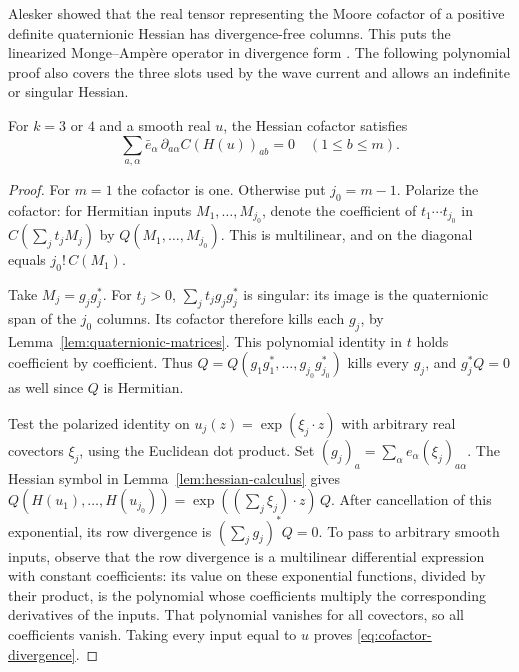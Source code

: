 Alesker showed that the real tensor representing the Moore cofactor
of a positive definite quaternionic Hessian has divergence-free columns.
This puts the linearized Monge--Ampère operator in divergence form
\cite[Lemma~4.6]{Alesker2013Flat}. The following polynomial proof
also covers the three slots used by the wave current and allows an
indefinite or singular Hessian.

\begin{lemma}\label{lem:cofactor-divergence}
For $k=3$ or $4$ and a smooth real $u$, the Hessian cofactor satisfies
\begin{equation}\label{eq:cofactor-divergence}
    \sum_{a,\alpha}\bar e_\alpha\,\partial_{a\alpha} C(H(u))_{ab}=0
    \quad(1\le b\le m).
\end{equation}
\end{lemma}

\begin{proof}
For $m=1$ the cofactor is one. Otherwise put $j_0=m-1$. Polarize
the cofactor: for Hermitian inputs $M_1,\ldots,M_{j_0}$, denote
the coefficient of $t_1\cdots t_{j_0}$ in $C(\sum_j t_jM_j)$ by
$Q(M_1,\ldots,M_{j_0})$. This is multilinear, and on the diagonal
equals $j_0!\,C(M_1)$.

Take $M_j=g_jg_j^*$. For $t_j>0$, $\sum_jt_jg_jg_j^*$ is singular:
its image is the quaternionic span of the $j_0$ columns. Its cofactor
therefore kills each $g_j$, by Lemma~\ref{lem:quaternionic-matrices}.
This polynomial identity in $t$ holds coefficient by coefficient.
Thus $Q=Q(g_1g_1^*,\ldots,g_{j_0}g_{j_0}^*)$ kills every $g_j$,
and $g_j^*Q=0$ as well since $Q$ is Hermitian.

Test the polarized identity on $u_j(z)=\exp(\xi_j\cdot z)$ with
arbitrary real covectors $\xi_j$, using the Euclidean dot product.
Set $(g_j)_a=\sum_\alpha e_\alpha(\xi_j)_{a\alpha}$. The Hessian
symbol in Lemma~\ref{lem:hessian-calculus} gives
$Q(H(u_1),\ldots,H(u_{j_0}))=\exp((\sum_j\xi_j)\cdot z)\,Q$.
After cancellation of this exponential, its row divergence is
$(\sum_jg_j)^*Q=0$. To pass to arbitrary smooth inputs, observe
that the row divergence is a multilinear differential expression with
constant coefficients: its value on these exponential functions,
divided by their product, is the polynomial whose coefficients
multiply the corresponding derivatives of the inputs. That polynomial
vanishes for all covectors, so all coefficients vanish. Taking every
input equal to $u$ proves \eqref{eq:cofactor-divergence}.
\end{proof}

